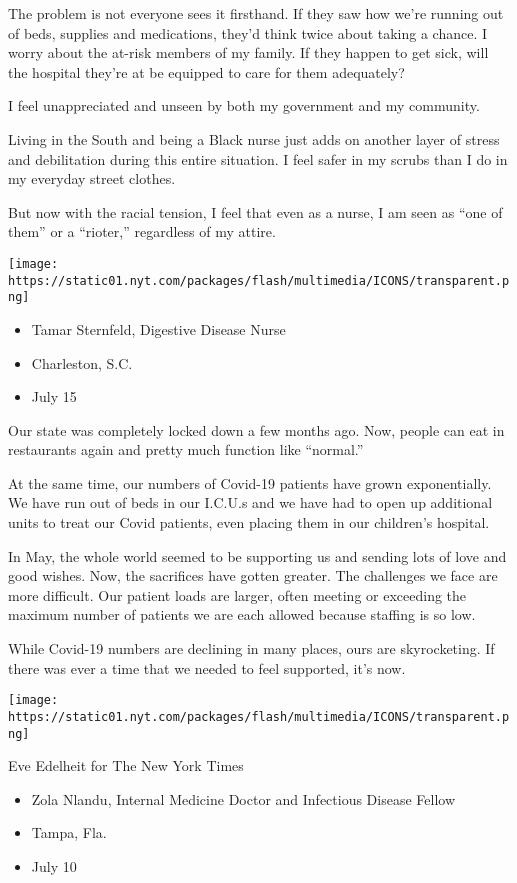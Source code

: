 The problem is not everyone sees it firsthand. If they saw how we're
running out of beds, supplies and medications, they'd think twice about
taking a chance. I worry about the at-risk members of my family. If they
happen to get sick, will the hospital they're at be equipped to care for
them adequately?

I feel unappreciated and unseen by both my government and my community.

Living in the South and being a Black nurse just adds on another layer
of stress and debilitation during this entire situation. I feel safer in
my scrubs than I do in my everyday street clothes.

But now with the racial tension, I feel that even as a nurse, I am seen
as ``one of them'' or a ``rioter,'' regardless of my attire.

\texttt{[image: https://static01.nyt.com/packages/flash/multimedia/ICONS/transparent.png]}

\begin{itemize}
\tightlist
\item
  Tamar Sternfeld, Digestive Disease Nurse
\item
  Charleston, S.C.
\item
  July 15
\end{itemize}

Our state was completely locked down a few months ago. Now, people can
eat in restaurants again and pretty much function like ``normal.''

At the same time, our numbers of Covid-19 patients have grown
exponentially. We have run out of beds in our I.C.U.s and we have had to
open up additional units to treat our Covid patients, even placing them
in our children's hospital.

In May, the whole world seemed to be supporting us and sending lots of
love and good wishes. Now, the sacrifices have gotten greater. The
challenges we face are more difficult. Our patient loads are larger,
often meeting or exceeding the maximum number of patients we are each
allowed because staffing is so low.

While Covid-19 numbers are declining in many places, ours are
skyrocketing. If there was ever a time that we needed to feel supported,
it's now.

\texttt{[image: https://static01.nyt.com/packages/flash/multimedia/ICONS/transparent.png]}

Eve Edelheit for The New York Times

\begin{itemize}
\tightlist
\item
  Zola Nlandu, Internal Medicine Doctor and Infectious Disease Fellow
\item
  Tampa, Fla.
\item
  July 10
\end{itemize}


